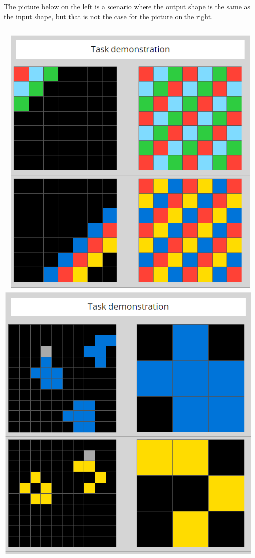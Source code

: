 \documentclass[letterpaper]{article} %
\begin{document}
The picture below on the left is a scenario where the output shape is the same as the input shape, but that is not the case for the picture on the right.

\includegraphics[scale=0.25]{ex1.png}
\includegraphics[scale=0.25]{ex2.png}
\end{document}
